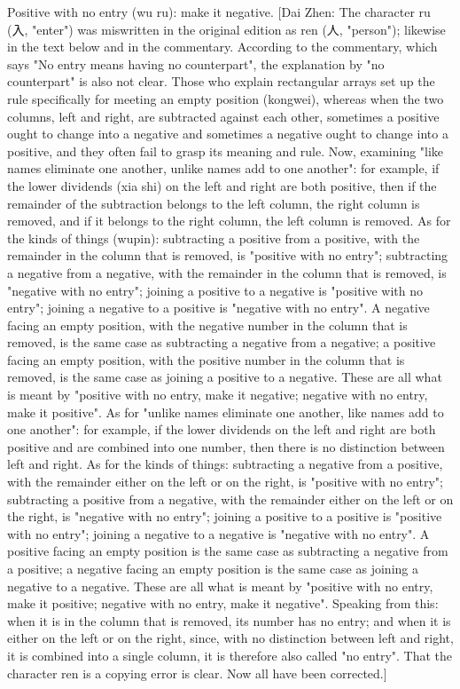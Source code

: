 \documentclass[11pt]{article}
\newenvironment{uniten}{\par\small\color{black!85}}{\par\medskip}
\begin{document}
\begin{uniten}Positive with no entry (wu ru): make it negative. [Dai Zhen: The character ru (入, "enter") was miswritten in the original edition as ren (人, "person"); likewise in the text below and in the commentary. According to the commentary, which says "No entry means having no counterpart", the explanation by "no counterpart" is also not clear. Those who explain rectangular arrays set up the rule specifically for meeting an empty position (kongwei), whereas when the two columns, left and right, are subtracted against each other, sometimes a positive ought to change into a negative and sometimes a negative ought to change into a positive, and they often fail to grasp its meaning and rule. Now, examining "like names eliminate one another, unlike names add to one another": for example, if the lower dividends (xia shi) on the left and right are both positive, then if the remainder of the subtraction belongs to the left column, the right column is removed, and if it belongs to the right column, the left column is removed. As for the kinds of things (wupin): subtracting a positive from a positive, with the remainder in the column that is removed, is "positive with no entry"; subtracting a negative from a negative, with the remainder in the column that is removed, is "negative with no entry"; joining a positive to a negative is "positive with no entry"; joining a negative to a positive is "negative with no entry". A negative facing an empty position, with the negative number in the column that is removed, is the same case as subtracting a negative from a negative; a positive facing an empty position, with the positive number in the column that is removed, is the same case as joining a positive to a negative. These are all what is meant by "positive with no entry, make it negative; negative with no entry, make it positive". As for "unlike names eliminate one another, like names add to one another": for example, if the lower dividends on the left and right are both positive and are combined into one number, then there is no distinction between left and right. As for the kinds of things: subtracting a negative from a positive, with the remainder either on the left or on the right, is "positive with no entry"; subtracting a positive from a negative, with the remainder either on the left or on the right, is "negative with no entry"; joining a positive to a positive is "positive with no entry"; joining a negative to a negative is "negative with no entry". A positive facing an empty position is the same case as subtracting a negative from a positive; a negative facing an empty position is the same case as joining a negative to a negative. These are all what is meant by "positive with no entry, make it positive; negative with no entry, make it negative". Speaking from this: when it is in the column that is removed, its number has no entry; and when it is either on the left or on the right, since, with no distinction between left and right, it is combined into a single column, it is therefore also called "no entry". That the character ren is a copying error is clear. Now all have been corrected.]\end{uniten}
\end{document}
